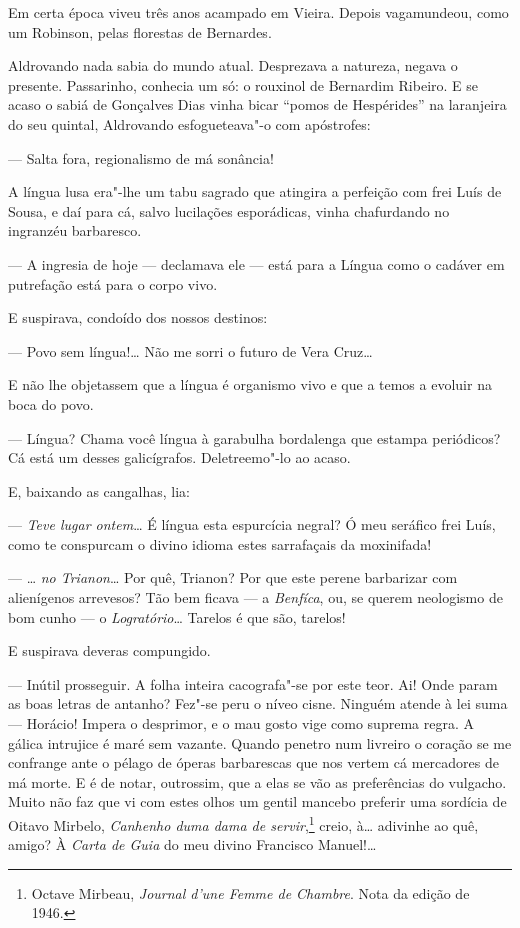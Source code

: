 Em certa época viveu três anos acampado em Vieira. Depois vagamundeou,
como um Robinson, pelas florestas de Bernardes.

Aldrovando nada sabia do mundo atual. Desprezava a natureza, negava o
presente. Passarinho, conhecia um só: o rouxinol de Bernardim Ribeiro. E
se acaso o sabiá de Gonçalves Dias vinha bicar ``pomos de Hespérides''
na laranjeira do seu quintal, Aldrovando esfogueteava"-o com apóstrofes:

--- Salta fora, regionalismo de má sonância!

A língua lusa era"-lhe um tabu sagrado que atingira a perfeição com frei
Luís de Sousa, e daí para cá, salvo lucilações esporádicas, vinha
chafurdando no ingranzéu barbaresco.

--- A ingresia de hoje --- declamava ele --- está para a Língua como o
cadáver em putrefação está para o corpo vivo.

E suspirava, condoído dos nossos destinos:

--- Povo sem língua!\ldots{} Não me sorri o futuro de Vera Cruz\ldots{}

E não lhe objetassem que a língua é organismo vivo e que a temos a
evoluir na boca do povo.

--- Língua? Chama você língua à garabulha bordalenga que estampa
periódicos? Cá está um desses galicígrafos. Deletreemo"-lo ao acaso.

E, baixando as cangalhas, lia:

--- \emph{Teve lugar ontem}\ldots{} É língua esta espurcícia negral? Ó meu
seráfico frei Luís, como te conspurcam o divino idioma estes sarrafaçais
da moxinifada!

--- \ldots{} \emph{no Trianon}\ldots{} Por quê, Trianon? Por que este perene
barbarizar com alienígenos arrevesos? Tão bem ficava --- a
\emph{Benfíca}, ou, se querem neologismo de bom cunho --- o
\emph{Logratório}\ldots{} Tarelos é que são, tarelos!

E suspirava deveras compungido.

--- Inútil prosseguir. A folha inteira cacografa"-se por este teor. Ai!
Onde param as boas letras de antanho? Fez"-se peru o níveo cisne. Ninguém
atende à lei suma --- Horácio! Impera o desprimor, e o mau gosto vige
como suprema regra. A gálica intrujice é maré sem vazante. Quando
penetro num livreiro o coração se me confrange ante o pélago de óperas
barbarescas que nos vertem cá mercadores de má morte. E é de notar,
outrossim, que a elas se vão as preferências do vulgacho. Muito não faz
que vi com estes olhos um gentil mancebo preferir uma sordícia de Oitavo
Mirbelo, \emph{Canhenho duma dama de servir},\footnote{Octave Mirbeau,
  \emph{Journal d'une Femme de Chambre}. Nota da edição de 1946.} creio,
à\ldots{} adivinhe ao quê, amigo? À \emph{Carta de Guia} do meu divino
Francisco Manuel!\ldots{}

